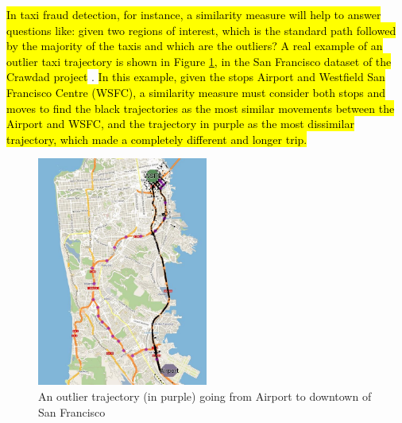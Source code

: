 \documentclass[12pt]{article}
\begin{document}
\hl{In taxi fraud detection, for instance, a similarity measure will help to answer questions like: given two regions of interest, which is the standard path followed by the majority of the taxis and which are the outliers?
A real example of an outlier taxi trajectory is shown in Figure {\ref{fig:crawdad_outlier}}, in the San Francisco dataset of the Crawdad project} \citep{epfl-mobility-20090224}. \hl{In this example, given the stops Airport and  Westfield San Francisco Centre (WSFC), a similarity measure must consider both stops and moves to find the black trajectories as the most similar movements between the Airport and WSFC, and the trajectory in purple as the most dissimilar trajectory, which made a completely different and longer trip.}
 
\begin{figure}[h]
\centering
\includegraphics[width=0.5\textwidth]{Images/CRAWDAD-Outlier.jpg}
\caption{\label{fig:crawdad_outlier} An outlier trajectory (in purple) going from Airport to downtown of San Francisco}
\end{figure}


\end{document}
